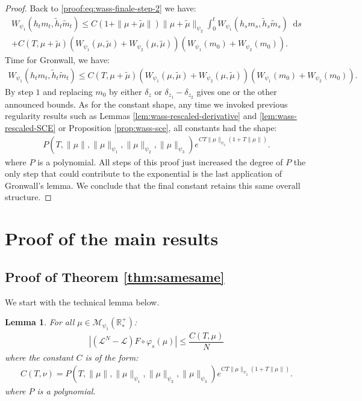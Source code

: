 \documentclass[11pt,a4paper]{article}
\newcommand{\RRP}{\mathbb{R}^+_*}
\newcommand{\MC}{\mathcal{M}}
\newcommand{\LC}{\mathcal{L}}
\newcommand{\dd}{\mathop{}\!\mathrm{d}}
\newtheorem{lemma}[theorem]{Lemma}
\begin{document}
\begin{proof}
    Back to \eqref{proof:eq:wass-finale-step-2} we have:
    \begin{multline*}
        W_{\psi_1}\left(h_t m_t , \tilde{h}_t \tilde{m}_t \right) \leq C(1 + \|\mu + \tilde{\mu}\|)\|\mu + \tilde{\mu}\|_{\psi_2}\int_0^t W_{\psi_1}\left(h_s m_s , \tilde{h}_s \tilde{m}_s \right) \dd s \\
        + C(T,\mu + \tilde{\mu})\left(W_{\psi_1}\left( \mu , \tilde{\mu}\right) + W_{\psi_2}\left( \mu , \tilde{\mu}\right)\right)\left(W_{\psi_1}(m_0) + W_{\psi_2}(m_0) \right).
    \end{multline*}
    Time for Gronwall, we have:
    \begin{align*}
        W_{\psi_1}\left(h_t m_t , \tilde{h}_t \tilde{m}_t \right) \leq C(T,\mu + \tilde{\mu})\left(W_{\psi_1}\left( \mu , \tilde{\mu}\right) + W_{\psi_2}\left( \mu , \tilde{\mu}\right)\right)\left(W_{\psi_1}(m_0) + W_{\psi_2}(m_0) \right).
    \end{align*}
    By step $1$ and replacing $m_0$ by either $\delta_z$ or $\delta_{z_1} - \delta_{z_2}$ gives one or the other announced bounds. As for the constant shape, any time we invoked previous regularity results such as Lemmas \ref{lem:wass-rescaled-derivative} and \ref{lem:wass-rescaled-SCE} or Proposition \ref{prop:wass-sce}, all constants had the shape:
    \begin{align*}
        P(T,\|\mu\|,\|\mu\|_{\psi_1},\|\mu\|_{\psi_2},\|\mu\|_{\psi_3}) e^{CT\|\mu\|_{\psi_2}(1 + T\|\mu\|)}.
    \end{align*}
    where $P$ is a polynomial. All steps of this proof just increased the degree of $P$ the only step that could contribute to the exponential is the last application of Gronwall's lemma. We conclude that the final constant retains this same overall structure.
\end{proof}

\newpage


\section{Proof of the main results}\label{Section:main-results}
\subsection{Proof of Theorem \ref{thm:samesame}}
We start with the technical lemma below.
\begin{lemma}\label{lem:bounds_diff_gen}
For all $\mu \in \MC_{\psi_1}(\RRP)$:
\begin{align*}
    \left| \left(\LC^N - \LC\right)F\circ \varphi_s (\mu) \right| \leq \dfrac{C(T,\mu)}{N}
\end{align*}
where the constant $C$ is of the form:
    \begin{align*}
        C(T,\nu) = P(T,\|\mu\|,\|\mu\|_{\psi_1},\|\mu\|_{\psi_2},\|\mu\|_{\psi_3}) e^{CT\|\mu\|_{\psi_2}(1 + T\|\mu\|)}.
    \end{align*}
    where $P$ is a polynomial.
\end{lemma}
\end{document}
